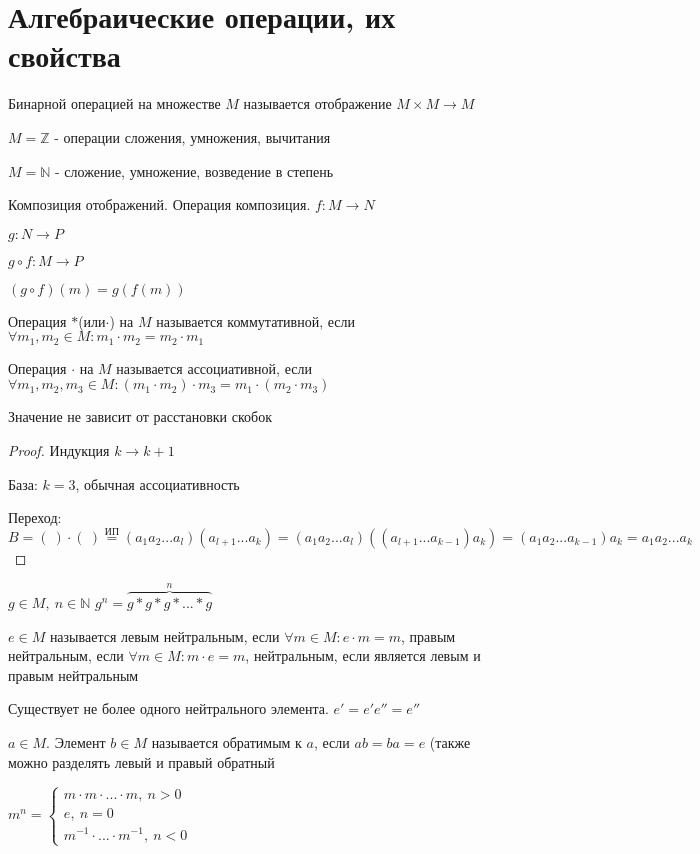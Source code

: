 \section{Алгебраические операции, их свойства}
\begin{conj}
    Бинарной операцией на множестве $M$ называется отображение $M\times M \to M$
\end{conj}

$M=\mathbb{Z}$ - операции сложения, умножения, вычитания

$M=\mathbb{N}$ - сложение, умножение, возведение в степень

\begin{conj}
Композиция отображений. Операция композиция. $f: M \to N$

$g: N\to P$

$g\circ f: M \to P$

$(g\circ f)(m) = g(f(m))$
\end{conj}
\begin{conj}
    Операция $*$(или$\cdot$) на $M$ называется коммутативной, если $\forall m_1, m_2 \in M : m_1\cdot m_2 = m_2\cdot m_1$
\end{conj}
\begin{conj}
    Операция $\cdot$ на $M$ называется ассоциативной, если $\forall m_1, m_2, m_3 \in M: (m_1\cdot m_2)\cdot m_3 = m_1\cdot(m_2\cdot m_3)$
\end{conj}
\begin{theorem}
Значение не зависит от расстановки скобок
\end{theorem}
\begin{proof}
Индукция $k \to k+1$

База: $k=3$, обычная ассоциативность

Переход: $B = (\ )\cdot(\ ) \overset{\text{ИП}}{=} (a_1a_2...a_l)(a_{l+1}...a_k) = (a_1a_2...a_l)((a_{l+1}...a_{k-1})a_k) = (a_1a_2...a_{k-1})a_k = a_1a_2...a_k$
\end{proof}
\begin{conj}
    $g \in M,\ n \in \mathbb{N}$ $g^n=\overbrace{g*g*g*...*g}^n$
\end{conj}

\begin{conj}
    $e \in M$ называется левым нейтральным, если $\forall m \in M: e\cdot m = m$, правым нейтральным, если $\forall m \in M: m\cdot e = m$, нейтральным, если является левым и правым нейтральным
\end{conj}
\begin{theorem-non}
    Существует не более одного нейтрального элемента. $e' = e'e'' = e''$
\end{theorem-non}
\begin{conj}
    $a \in M$. Элемент $b \in M$ называется обратимым к $a$, если $ab = ba = e$ (также можно разделять левый и правый обратный
\end{conj}
\begin{conj}
    $m^n = \begin{cases}
    m\cdot m\cdot ...\cdot m,\ n>0\\
    e,\ n=0\\
    m^{-1}\cdot ... \cdot m^{-1},\ n<0
    \end{cases}$
\end{conj}